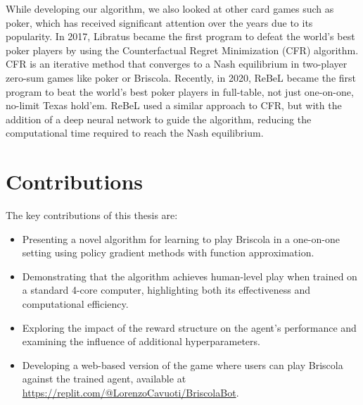 While developing our algorithm, we also looked at other card games such as poker, which has received significant attention over the years due to its popularity. In 2017, Libratus \cite{libratus} became the first program to defeat the world's best poker players by using the Counterfactual Regret Minimization (CFR) \cite{cfr} algorithm. CFR is an iterative method that converges to a Nash equilibrium in two-player zero-sum games like poker or Briscola. Recently, in 2020, ReBeL \cite{rebel} became the first program to beat the world's best poker players in full-table, not just one-on-one, no-limit Texas hold'em. ReBeL used a similar approach to CFR, but with the addition of a deep neural network to guide the algorithm, reducing the computational time required to reach the Nash equilibrium.

\section{Contributions}
The key contributions of this thesis are:
\begin{itemize}
    \item Presenting a novel algorithm for learning to play Briscola in a one-on-one setting using policy gradient methods with function approximation.
    \item Demonstrating that the algorithm achieves human-level play when trained on a standard 4-core computer, highlighting both its effectiveness and computational efficiency.
    \item Exploring the impact of the reward structure on the agent's performance and examining the influence of additional hyperparameters.
    \item Developing a web-based version of the game where users can play Briscola against the trained agent, available at \url{https://replit.com/@LorenzoCavuoti/BriscolaBot}.
\end{itemize}

